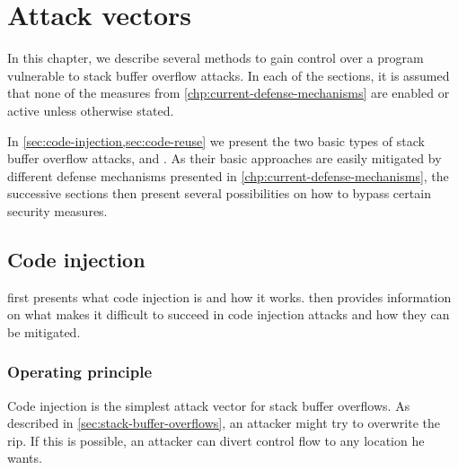 \chapter{Attack vectors}
\label{chp:attack-vectors}

In this chapter, we describe several methods to gain control over a program vulnerable to stack buffer overflow attacks.
In each of the sections, it is assumed that none of the measures from \cref{chp:current-defense-mechanisms} are enabled or active unless otherwise stated.

In \cref{sec:code-injection,sec:code-reuse} we present the two basic types of stack buffer overflow attacks,  and .
As their basic approaches are easily mitigated by different defense mechanisms presented in \cref{chp:current-defense-mechanisms}, the successive sections then present several possibilities on how to bypass certain security measures.


\section{Code injection}
\label{sec:code-injection}

 first presents what code injection is and how it works.
 then provides information on what makes it difficult to succeed in code injection attacks and how they can be mitigated.

\subsection{Operating principle}
\label{subsec:ci-operating-principle}

Code injection is the simplest attack vector for stack buffer overflows.
As described in \cref{sec:stack-buffer-overflows}, an attacker might try to overwrite the \gls{rip}.
If this is possible, an attacker can divert control flow to any location he wants.

